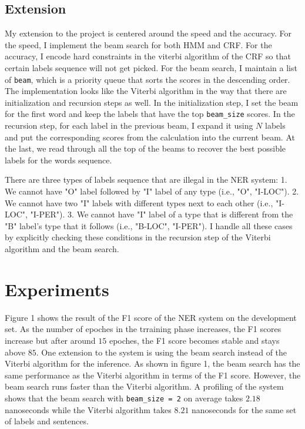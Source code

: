 \documentclass[11pt,a4paper]{article}
\begin{document}
\subsection{Extension}

My extension to the project is centered around the speed and the accuracy. 
For the speed, I implement the beam search for both HMM and CRF. 
For the accuracy, I encode hard constraints in the viterbi algorithm of the CRF
so that certain labels sequence will not get picked.
For the beam search, I maintain a list of \verb|beam|, which is a priority queue
that sorts the scores in the descending order. The implementation looks like
the Viterbi algorithm in the way that there are initialization and recursion steps as well. 
In the initialization
step, I set the beam for the first word and keep the labels that have the top \verb|beam_size|
scores. In the recursion step, for each label in the previous beam, I expand it
using $N$ labels and put the corresponding scores from the calculation 
into the current beam. At the last, we read through all the top of the beams to recover 
the best possible labels for the words sequence.

There are three types of labels sequence that are illegal in the NER system: 
1. We cannot have "O" label followed
by "I" label of any type (i.e., "O", "I-LOC"). 2. We cannot have two "I" labels with different
types next to each other (i.e., "I-LOC", "I-PER"). 3. We cannot have "I" label of a type that
is different from the "B" label's type that it follows (i.e., "B-LOC", "I-PER"). I handle all these
cases by explicitly checking these conditions in the recursion step of the Viterbi algorithm and
the beam search.

\section{Experiments}

Figure 1 shows the result of the F1 score of the NER system on the development set.
As the number of epoches in the trraining phase increases, the F1 scores increase 
but after around $15$ epoches, the F1 score becomes stable and stays above $85$. One extension to the system
is using the beam search instead of the Viterbi algorithm for the inference.
As shown in figure 1, the beam search has the same performance as the Viterbi algorithm
in terms of the F1 score. However, the beam search runs faster than the Viterbi algorithm.
A profiling of the system shows that 
the beam search with \verb|beam_size = 2| on average takes $2.18$ nanoseconds 
while the Viterbi algorithm takes $8.21$ nanoseconds for the same set of labels 
and sentences. 
\end{document}
